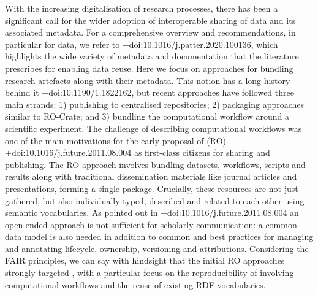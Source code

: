 \markdownRendererInterblockSeparator
{}With the increasing digitalisation of research processes, there has been a significant call for the wider adoption of interoperable sharing of data and its associated metadata. For a comprehensive overview and recommendations, in particular for data, we refer to +{}{}{doi:10.1016/j.patter.2020.100136}, which highlights the wide variety of metadata and documentation that the literature prescribes for enabling data reuse. \markdownRendererInterblockSeparator
{}Here we focus on approaches for bundling research artefacts along with their metadata. This notion has a long history behind it +{}{}{doi:10.1190/1.1822162}, but recent approaches have followed three main strands: 1) publishing to centralised repositories; 2) packaging approaches similar to RO-Crate; and 3) bundling the computational workflow around a scientific experiment. \markdownRendererInterblockSeparator
{}%
{}\markdownRendererInterblockSeparator
{}The challenge of describing computational workflows was one of the main motivations for the early proposal of  (RO) +{}{}{doi:10.1016/j.future.2011.08.004} as first-class citizens for sharing and publishing. The RO approach involves bundling datasets, workflows, scripts and results along with traditional dissemination materials like journal articles and presentations, forming a single package. Crucially, these resources are not just gathered, but also individually typed, described and related to each other using semantic vocabularies. As pointed out in +{}{}{doi:10.1016/j.future.2011.08.004} an open-ended  approach is not sufficient for scholarly communication: a common data model is also needed in addition to common and best practices for managing and annotating lifecycle, ownership, versioning and attributions.\markdownRendererInterblockSeparator
{}Considering the FAIR principles, we can say with hindsight that the initial RO approaches strongly targeted , with a particular focus on the reproducibility of  involving computational workflows and the reuse of existing RDF vocabularies. \markdownRendererInterblockSeparator
